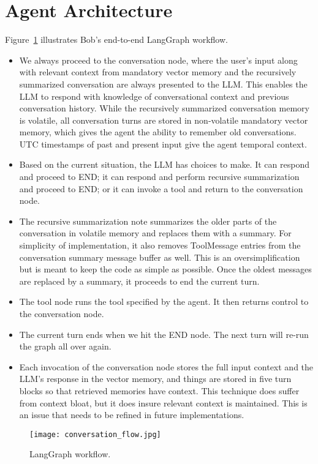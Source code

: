 \documentclass[conference]{IEEEtran}
\begin{document}
\section{Agent Architecture}
Figure~\ref{fig:workflow} illustrates Bob’s end-to-end LangGraph workflow.
\begin{itemize}[leftmargin=*]
  \item We always proceed to the conversation node, where the user's input along with relevant context from mandatory vector memory and the recursively summarized conversation are always presented to the LLM.  This enables the LLM to respond with knowledge of conversational context and previous conversation history.  While the recursively summarized conversation memory is volatile, all conversation turns are stored in non-volatile mandatory vector memory, which gives the agent the ability to remember old conversations.  UTC timestamps of past and present input give the agent temporal context.
  \item Based on the current situation, the LLM has choices to make.  It can respond and proceed to END; it can respond and perform recursive summarization and proceed to END; or it can invoke a tool and return to the conversation node.
  \item The recursive summarization note summarizes the older parts of the conversation in volatile memory and replaces them with a summary.  For simplicity of implementation, it also removes ToolMessage entries from the conversation summary message buffer as well.  This is an oversimplification but is meant to keep the code as simple as possible.  Once the oldest messages are replaced by a summary, it proceeds to end the current turn.
  \item The tool node runs the tool specified by the agent.  It then returns control to the conversation node.
  \item The current turn ends when we hit the END node.  The next turn will re-run the graph all over again.
  \item Each invocation of the conversation node stores the full input context and the LLM's response in the vector memory, and things are stored in five turn blocks so that retrieved memories have context.  This technique does suffer from context bloat, but it does insure relevant context is maintained.  This is an issue that needs to be refined in future implementations.
\end{itemize}

\begin{figure}[H]
  \centering
  \texttt{[image: conversation\_flow.jpg]}
  \caption{LangGraph workflow.}
  \label{fig:workflow}
\end{figure}
\end{document}
